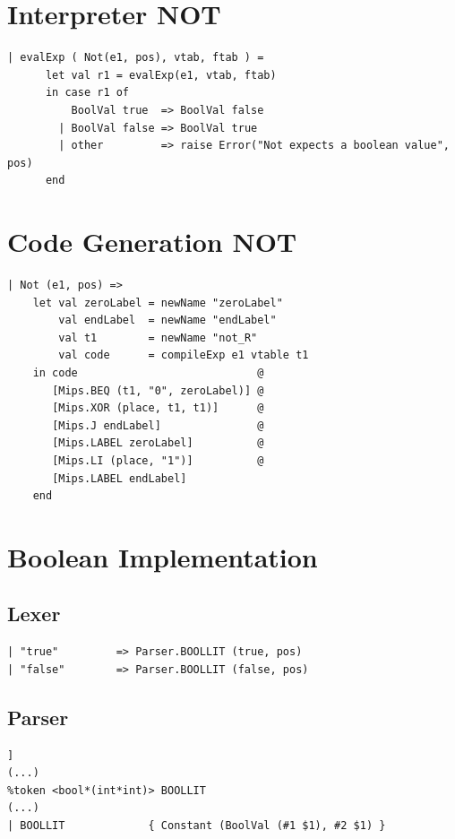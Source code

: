 \documentclass[11pt]{article}
\begin{document}
    \newpage
    \section{Interpreter NOT} \label{interpreter_not}
    \begin{lstlisting}
| evalExp ( Not(e1, pos), vtab, ftab ) =
      let val r1 = evalExp(e1, vtab, ftab)
      in case r1 of
          BoolVal true  => BoolVal false
        | BoolVal false => BoolVal true
        | other         => raise Error("Not expects a boolean value", pos)
      end
    \end{lstlisting}

    \newpage
    \section{Code Generation NOT} \label{code_gen_not}
    \begin{lstlisting}
| Not (e1, pos) =>
    let val zeroLabel = newName "zeroLabel"
        val endLabel  = newName "endLabel"
        val t1        = newName "not_R"
        val code      = compileExp e1 vtable t1
    in code                            @
       [Mips.BEQ (t1, "0", zeroLabel)] @
       [Mips.XOR (place, t1, t1)]      @
       [Mips.J endLabel]               @
       [Mips.LABEL zeroLabel]          @
       [Mips.LI (place, "1")]          @
       [Mips.LABEL endLabel]
    end
    \end{lstlisting}

    \newpage
    \section{Boolean Implementation} \label{boolean_implementation}
    \subsection{Lexer}
    \begin{lstlisting}
| "true"         => Parser.BOOLLIT (true, pos)
| "false"        => Parser.BOOLLIT (false, pos)
    \end{lstlisting}

    \subsection{Parser}
    \begin{lstlisting}]
(...)
%token <bool*(int*int)> BOOLLIT
(...)
| BOOLLIT             { Constant (BoolVal (#1 $1), #2 $1) }
    \end{lstlisting}
\end{document}
